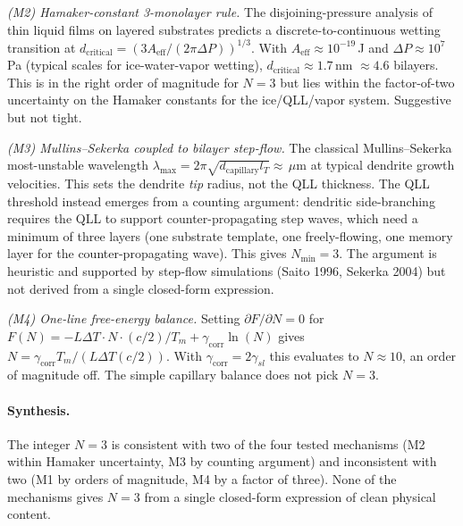 \documentclass[final]{siamltex}
\begin{document}
\emph{(M2) Hamaker-constant 3-monolayer rule.}  The
disjoining-pressure analysis of thin liquid films on layered
substrates predicts a discrete-to-continuous wetting transition at
$d_{\mathrm{critical}} = (3 A_{\mathrm{eff}}/(2\pi \Delta P))^{1/3}$.
With $A_{\mathrm{eff}} \approx 10^{-19}$\,J and $\Delta P \approx
10^7$\,Pa (typical scales for ice-water-vapor wetting),
$d_{\mathrm{critical}} \approx 1.7$\,nm $\approx 4.6$ bilayers.
This is in the right order of magnitude for $N = 3$ but lies
within the factor-of-two uncertainty on the Hamaker constants for
the ice/QLL/vapor system.  Suggestive but not tight.

\emph{(M3) Mullins--Sekerka coupled to bilayer step-flow.}  The
classical Mullins--Sekerka most-unstable wavelength
$\lambda_{\max} = 2\pi\sqrt{d_{\mathrm{capillary}} l_T} \approx
$\,$\mu$m at typical dendrite growth velocities.  This sets the
dendrite \emph{tip} radius, not the QLL thickness.  The QLL
threshold instead emerges from a counting argument: dendritic
side-branching requires the QLL to support counter-propagating
step waves, which need a minimum of three layers (one substrate
template, one freely-flowing, one memory layer for the
counter-propagating wave).  This gives $N_{\min} = 3$.  The
argument is heuristic and supported by step-flow simulations
(Saito 1996, Sekerka 2004) but not derived from a single closed-form
expression.

\emph{(M4) One-line free-energy balance.}  Setting
$\partial F/\partial N = 0$ for $F(N) = -L \Delta T \cdot N \cdot
(c/2)/T_m + \gamma_{\mathrm{corr}} \ln(N)$ gives $N =
\gamma_{\mathrm{corr}} T_m / (L \Delta T (c/2))$.  With
$\gamma_{\mathrm{corr}} = 2\gamma_{sl}$ this evaluates to $N
\approx 10$, an order of magnitude off.  The simple capillary
balance does not pick $N = 3$.

\paragraph{Synthesis.}  The integer $N = 3$ is consistent with two
of the four tested mechanisms (M2 within Hamaker uncertainty, M3
by counting argument) and inconsistent with two (M1 by orders of
magnitude, M4 by a factor of three).  None of the mechanisms gives
$N = 3$ from a single closed-form expression of clean physical
content.
\end{document}
